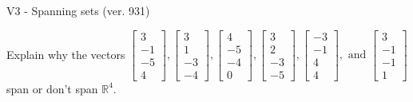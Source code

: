 \begin{exercise}
  \begin{exerciseTitle}V3 - Spanning sets (ver. 931)\end{exerciseTitle}
  \begin{exerciseStatement}
    Explain why the vectors \(\left[\begin{array}{r}
3 \\
-1 \\
-5 \\
4
\end{array}\right] , \left[\begin{array}{r}
3 \\
1 \\
-3 \\
-4
\end{array}\right] , \left[\begin{array}{r}
4 \\
-5 \\
-4 \\
0
\end{array}\right] , \left[\begin{array}{r}
3 \\
2 \\
-3 \\
-5
\end{array}\right] , \left[\begin{array}{r}
-3 \\
-1 \\
4 \\
4
\end{array}\right] , \text{ and } \left[\begin{array}{r}
3 \\
-1 \\
-1 \\
1
\end{array}\right]\) span or don't span \(\mathbb{R}^4\). 
	



\end{exerciseStatement}
\end{exercise}
